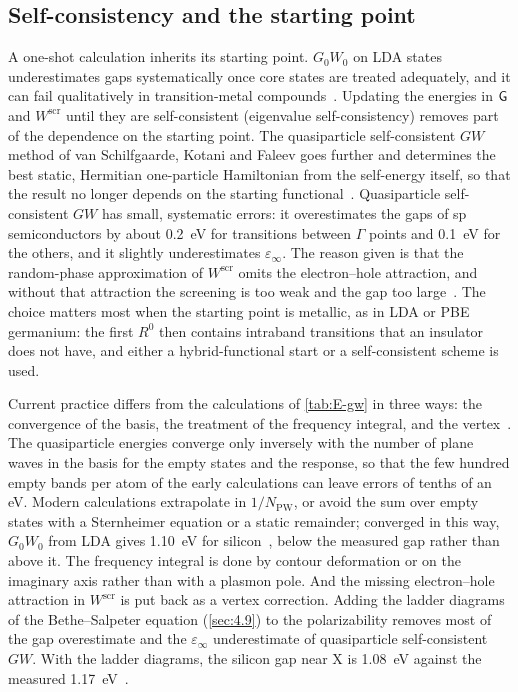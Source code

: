 \subsection{Self-consistency and the starting point}

A one-shot calculation inherits its starting point. $G_0W_0$ on LDA states underestimates gaps systematically once core states are treated adequately, and it can fail qualitatively in transition-metal compounds~\cite{vanschilfgaarde2006quasiparticle}. Updating the energies in $\mathsf{G}$ and $W^{\mathrm{scr}}$ until they are self-consistent (eigenvalue self-consistency) removes part of the dependence on the starting point. The quasiparticle self-consistent $GW$ method of van Schilfgaarde, Kotani and Faleev goes further and determines the best static, Hermitian one-particle Hamiltonian from the self-energy itself, so that the result no longer depends on the starting functional~\cite{vanschilfgaarde2006quasiparticle}. Quasiparticle self-consistent $GW$ has small, systematic errors: it overestimates the gaps of sp semiconductors by about \SI{0.2}{eV} for transitions between $\Gamma$ points and \SI{0.1}{eV} for the others, and it slightly underestimates $\varepsilon_\infty$. The reason given is that the random-phase approximation of $W^{\mathrm{scr}}$ omits the electron--hole attraction, and without that attraction the screening is too weak and the gap too large~\cite{vanschilfgaarde2006quasiparticle}. The choice matters most when the starting point is metallic, as in LDA or PBE germanium: the first $R^0$ then contains intraband transitions that an insulator does not have, and either a hybrid-functional start or a self-consistent scheme is used.

Current practice differs from the calculations of \cref{tab:E-gw} in three ways: the convergence of the basis, the treatment of the frequency integral, and the vertex~\cite[Sects.~IV\,C--F, V and~XI\,D]{golze2019gw}. The quasiparticle energies converge only inversely with the number of plane waves in the basis for the empty states and the response, so that the few hundred empty bands per atom of the early calculations can leave errors of tenths of an eV. Modern calculations extrapolate in $1/N_{\mathrm{PW}}$, or avoid the sum over empty states with a Sternheimer equation or a static remainder; converged in this way, $G_0W_0$ from LDA gives \SI{1.10}{eV} for silicon~\cite[Sect.~IV\,C]{klimes2014predictive}, below the measured gap rather than above it. The frequency integral is done by contour deformation or on the imaginary axis rather than with a plasmon pole. And the missing electron--hole attraction in $W^{\mathrm{scr}}$ is put back as a vertex correction. Adding the ladder diagrams of the Bethe--Salpeter equation (\cref{sec:4.9}) to the polarizability removes most of the gap overestimate and the $\varepsilon_\infty$ underestimate of quasiparticle self-consistent $GW$. With the ladder diagrams, the silicon gap near X is \SI{1.08}{eV} against the measured \SI{1.17}{eV}~\cite[Table~1]{cunningham2023qsgw}.

